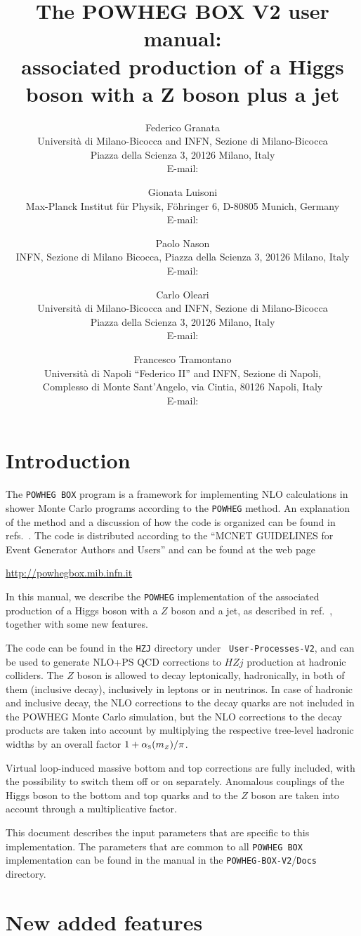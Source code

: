 \documentclass[paper]{JHEP3}
\title{The POWHEG BOX V2 user manual:\\
  associated production of a Higgs boson with a $\boldsymbol{Z}$ boson plus a jet} \vfill
\author{Federico Granata\\
  Universit\`a di Milano-Bicocca and INFN, Sezione di Milano-Bicocca\\
  Piazza della Scienza 3, 20126 Milano, Italy\\
  E-mail: \email{federico.granata@mib.infn.it}}
\author{Gionata Luisoni\\ 
  Max-Planck Institut f{\"u}r Physik, F\"ohringer 6, D-80805 Munich, Germany\\
  E-mail: \email{luisonig@mpp.mpg.de}
}
\author{Paolo Nason\\
  INFN, Sezione di Milano Bicocca, Piazza della Scienza 3, 20126 Milano, Italy\\
  E-mail: \email{paolo.nason@mib.infn.it}
}
\author{Carlo Oleari\\
  Universit\`a di Milano-Bicocca and INFN, Sezione di Milano-Bicocca\\
  Piazza della Scienza 3, 20126 Milano, Italy\\
  E-mail: \email{carlo.oleari@mib.infn.it}}
\author{Francesco Tramontano\\
  Universit\`a di Napoli ``Federico II'' and INFN, Sezione di Napoli,\\
  Complesso di Monte Sant'Angelo, via Cintia, 80126 Napoli, Italy\\
  E-mail: \email{francesco.tramontano@na.infn.it}
}
\newcommand\sss{\mathchoice%
{\displaystyle}%
{\scriptstyle}%
{\scriptscriptstyle}%
{\scriptscriptstyle}%
}
\newcommand\as{\alpha_{\sss\rm S}}
\newcommand\POWHEG{{\tt POWHEG}}
\newcommand\POWHEGBOX{{\tt POWHEG BOX}}
\newcommand\POWHEGBOXV{{\tt POWHEG-BOX-V2}}
\newcommand\HZJ{{\tt HZJ}}
\begin{document}
\section{Introduction}

The \POWHEGBOX{} program is a framework for implementing NLO calculations in
shower Monte Carlo programs according to the \POWHEG{} method. An explanation
of the method and a discussion of how the code is organized can be found in
refs.~\cite{Nason:2004rx,Frixione:2007vw,Alioli:2010xd}.  The code is
distributed according to the ``MCNET GUIDELINES for Event Generator Authors
and Users'' and can be found at the web page
%
\begin{center}
 \url{http://powhegbox.mib.infn.it}
\end{center}
%
In this manual, we describe the \POWHEG{} implementation of the
associated production of a Higgs boson with a $Z$ boson and a jet, as
described in ref.~\cite{Luisoni:2013cuh}, together with some new
features.

The code can be found in the \HZJ{} directory under {\tt
  User-Processes-V2}, and can be used to generate NLO+PS QCD
corrections to $HZj$ production at hadronic colliders.  The $Z$ boson
is allowed to decay leptonically, hadronically, in both of them (inclusive
decay), inclusively in leptons or in neutrinos.  In case of hadronic
and inclusive decay, the NLO corrections to the decay quarks are not
included in the POWHEG Monte Carlo simulation, but the NLO corrections
to the decay products are taken into account by multiplying the
respective tree-level hadronic widths by an overall factor
$1+\as(m_{\sss Z})/\pi$.

Virtual loop-induced massive bottom and top corrections are fully included,
with the possibility to switch them off or on separately.  Anomalous
couplings of the Higgs boson to the bottom and top quarks and to the $Z$
boson are taken into account through a multiplicative factor.

This document describes the input parameters that are specific to this
implementation. The parameters that are common to all \POWHEGBOX{}
implementation can be found in the manual in the \POWHEGBOXV{}/{\tt Docs}
directory.




\section{New added features}
\end{document}
